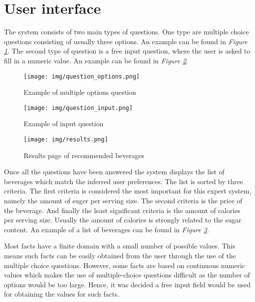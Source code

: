 \documentclass[11pt,a4paper]{article}
\begin{document}
\section{User interface}

The system consists of two main types of questions. One type are multiple choice questions consisting of usually three options. An example can be found in \textit{Figure \ref{fig:question-options}}. The second type of question is a free input question, where the user is asked to fill in a numeric value. An example can be found in \textit{Figure \ref{fig:question-input}}.

\begin{figure}[!h]
	\centering
	\texttt{[image: img/question\_options.png]}
	\caption{Example of multiple options question}
	\label{fig:question-options}
\end{figure}

\begin{figure}[!h]
	\centering
	\texttt{[image: img/question\_input.png]}
	\caption{Example of input question}
	\label{fig:question-input}
\end{figure}

\begin{figure}[!h]
	\centering
	\texttt{[image: img/results.png]}
	\caption{Results page of recommended beverages}
	\label{fig:results}
\end{figure}

Once all the questions have been answered the system displays the list of beverages which match the inferred user preferences. The list is sorted by three criteria. The first criteria is considered the most important for this expert system, namely the amount of suger per serving size. The second criteria is the price of the beverage. And finally the least significant criteria is the amount of calories per serving size. Usually the amount of calories is strongly related to the sugar content. An example of a list of beverages can be found in \textit{Figure \ref{fig:results}}.

Most facts have a finite domain with a small number of possible values. This means such facts can be easily obtained from the user through the use of the multiple choice questions. However, some facts are based on continuous numeric values which makes the use of multiple-choice questions difficult as the number of options would be too large. Hence, it was decided a free input field would be used for obtaining the values for such facts.     
\end{document}
